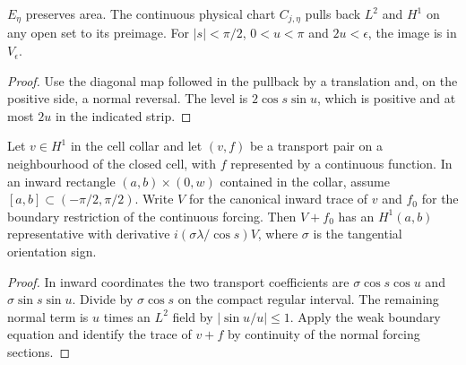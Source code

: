 \begin{lemma}
\label{lem:edge-inward-pullback}
\leanok
$E_\eta$ preserves area. The continuous physical chart $C_{j,\eta}$
pulls back $L^2$ and $H^1$ on any open set to its preimage.
For $|s|<\pi/2$, $0<u<\pi$ and $2u<\epsilon$, the image is in $V_\epsilon$.
\end{lemma}
\begin{proof}
\leanok
Use the diagonal map followed in the pullback by a translation and,
on the positive side, a normal reversal. The level is $2\cos s\sin u$,
which is positive and at most $2u$ in the indicated strip.
\end{proof}

\begin{lemma}
\label{lem:edge-window-transport}
\leanok
Let $v\in H^1$ in the cell collar and let $(v,f)$ be a transport pair
on a neighbourhood of the closed cell, with $f$ represented by a continuous
function. In an inward rectangle $(a,b)\times(0,w)$ contained in the collar,
assume $[a,b]\subset(-\pi/2,\pi/2)$. Write $V$ for the canonical inward
trace of $v$ and $f_0$ for the boundary restriction of the continuous forcing.
Then $V+f_0$ has an $H^1(a,b)$ representative with derivative
$i(\sigma\lambda/\cos s)V$, where $\sigma$ is the tangential orientation sign.
\end{lemma}
\begin{proof}
\leanok
In inward coordinates the two transport coefficients are
$\sigma\cos s\cos u$ and $\sigma\sin s\sin u$. Divide by $\sigma\cos s$
on the compact regular interval. The remaining normal term is $u$ times
an $L^2$ field by $|\sin u/u|\leq1$. Apply the weak boundary equation
and identify the trace of $v+f$ by continuity of the normal forcing sections.
\end{proof}

